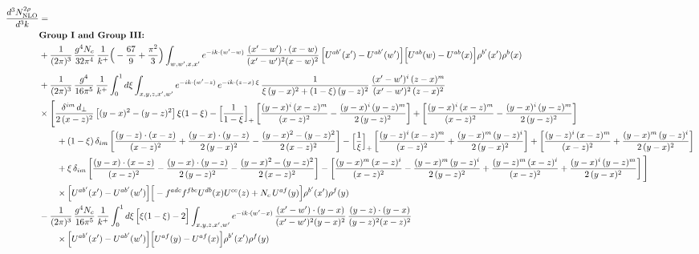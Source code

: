 \documentclass[10pt]{article}
\numberwithin{equation}{section}
\begin{document}
\begin{align}
\frac{d^{3}N^{2\rho}_{\rm NLO}}{d^{3}k}&=\notag\\
&\textbf{Group I and Group III:}\notag\\
&+\frac{1}{(2\pi)^{3}}\,\frac{g^{4}N_{c}}{32\pi^{4}}\,\frac{1}{k^{+}}\Big(-\frac{67}{9}+\frac{\pi^{2}}{3}\Big)\int_{w,w^{\prime},x,x^{\prime}}e^{-ik\cdot (w^{\prime}-w)}\,\frac{(x^{\prime}-w^{\prime})\cdot(x-w)}{(x^{\prime}-w^{\prime})^{2}(x-w)^{2}}\,\Big[U^{ab^{\prime}}(x^{\prime})-U^{ab^{\prime}}(w^{\prime})\Big]\Big[U^{ab}(w)-U^{ab}(x)\Big]\rho^{b^{\prime}}(x^{\prime})\rho^{b}(x)\notag\\[4pt]
&+\frac{1}{(2\pi)^{3}}\,\frac{g^{4}}{16\pi^{5}}\,\frac{1}{k^{+}}\int_{0}^{1}d\xi\int_{x,y,z,x^{\prime},w^{\prime}}e^{-ik\cdot (w^{\prime}-z)}\,e^{-ik\cdot (z-x)\,\xi}\,\frac{1}{\xi\,(y-x)^{2}+(1-\xi)\,(y-z)^{2}}\,\frac{(x^{\prime}-w^{\prime})^{i}\,(z-x)^{m}}{(x^{\prime}-w^{\prime})^{2}\,(z-x)^{2}}\notag\\
&\times\Bigg[\frac{\delta^{im}\,d_{\perp}}{2\,(x-z)^{2}}\left[(y-x)^{2}-(y-z)^{2}\right]\xi(1-\xi)
-\Big[\frac{1}{1-\xi}\Big]_{+}\left[\frac{(y-x)^{i}\,(x-z)^{m}}{(x-z)^{2}}-\frac{(y-x)^{i}\,(y-z)^{m}}{2\,(y-z)^{2}}\right]
+\left[\frac{(y-x)^{i}\,(x-z)^{m}}{(x-z)^{2}}-\frac{(y-x)^{i}\,(y-z)^{m}}{2\,(y-z)^{2}}\right]\notag\\
&\qquad+(1-\xi)\,\delta_{im}\left[\frac{(y-z)\cdot(x-z)}{(x-z)^{2}}+\frac{(y-x)\cdot(y-z)}{2\,(y-x)^{2}}-\frac{(y-x)^{2}-(y-z)^{2}}{2\,(x-z)^{2}}\right]
-\Big[\frac{1}{\xi}\Big]_{+}\left[\frac{(y-z)^{i}\,(x-z)^{m}}{(x-z)^{2}}+\frac{(y-x)^{m}\,(y-z)^{i}}{2\,(y-x)^{2}}\right]+\left[\frac{(y-z)^{i}\,(x-z)^{m}}{(x-z)^{2}}+\frac{(y-x)^{m}\,(y-z)^{i}}{2\,(y-x)^{2}}\right]\notag\\
&\qquad+\xi\,\delta_{im}\left[\frac{(y-x)\cdot(x-z)}{(x-z)^{2}}-\frac{(y-x)\cdot(y-z)}{2\,(y-z)^{2}}-\frac{(y-x)^{2}-(y-z)^{2}}{2\,(x-z)^{2}}\right]
-\left[\frac{(y-x)^{m}\,(x-z)^{i}}{(x-z)^{2}}-\frac{(y-x)^{m}\,(y-z)^{i}}{2\,(y-z)^{2}}+\frac{(y-z)^{m}\,(x-z)^{i}}{(x-z)^{2}}+\frac{(y-x)^{i}\,(y-z)^{m}}{2\,(y-x)^{2}}\right]\Bigg]\notag\\
&\qquad\times\Big[U^{ab^{\prime}}(x^{\prime})-U^{ab^{\prime}}(w^{\prime})\Big]\Big[-f^{adc}f^{fbe}U^{db}(x)U^{ce}(z)+N_{c}\,U^{af}(y)\Big]\rho^{b^{\prime}}(x^{\prime})\rho^{f}(y)\notag\\
&-\frac{1}{(2\pi)^{3}}\,\frac{g^{4}N_{c}}{16\pi^{5}}\,\frac{1}{k^{+}}\int_{0}^{1}d\xi\,\Big[\xi(1-\xi)-2\Big]\int_{x,y,z,x^{\prime},w^{\prime}}e^{-ik\cdot (w^{\prime}-x)}\,\frac{(x^{\prime}-w^{\prime})\cdot(y-x)}{(x^{\prime}-w^{\prime})^{2}(y-x)^{2}}\,\frac{(y-z)\cdot(y-x)}{(y-z)^{2}(x-z)^{2}}\notag\\&\qquad\times\Big[U^{ab^{\prime}}(x^{\prime})-U^{ab^{\prime}}(w^{\prime})\Big]\Big[U^{af}(y)-U^{af}(x)\Big]\rho^{b^{\prime}}(x^{\prime})\rho^{f}(y)\notag\\[4pt]

\end{align}
\end{document}
